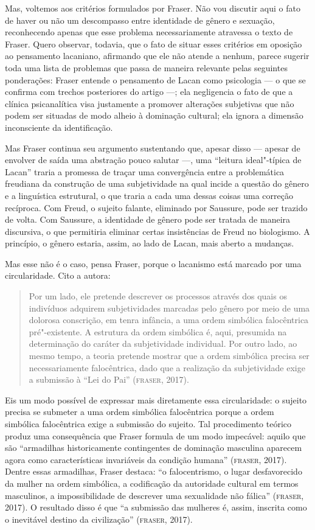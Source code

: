 Mas, voltemos aos critérios formulados por Fraser. Não vou discutir aqui
o fato de haver ou não um descompasso entre identidade de gênero e
sexuação, reconhecendo apenas que esse problema necessariamente
atravessa o texto de Fraser. Quero observar, todavia, que o fato de
situar esses critérios em oposição ao pensamento lacaniano, afirmando
que ele não atende a nenhum, parece sugerir toda uma lista de problemas
que passa de maneira relevante pelas seguintes ponderações: Fraser
entende o pensamento de Lacan como psicologia --- o que se confirma com
trechos posteriores do artigo ---; ela negligencia o fato de que a
clínica psicanalítica visa justamente a promover alterações subjetivas
que não podem ser situadas de modo alheio à dominação cultural; ela
ignora a dimensão inconsciente da identificação.

Mas Fraser continua seu argumento sustentando que, apesar disso ---
apesar de envolver de saída uma abstração pouco salutar ---, uma
``leitura ideal"-típica de Lacan'' traria a promessa de traçar uma
convergência entre a problemática freudiana da construção de uma
subjetividade na qual incide a questão do gênero e a linguística
estrutural, o que traria a cada uma dessas coisas uma correção
recíproca. Com Freud, o sujeito falante, eliminado por Saussure, pode
ser trazido de volta. Com Saussure, a identidade de gênero pode ser
tratada de maneira discursiva, o que permitiria eliminar certas
insistências de Freud no biologismo. A princípio, o gênero estaria,
assim, ao lado de Lacan, mais aberto a mudanças.

Mas esse não é o caso, pensa Fraser, porque o lacanismo está marcado por
uma circularidade. Cito a autora:

\begin{quote}
Por um lado, ele pretende descrever os processos através dos quais os
indivíduos adquirem subjetividades marcadas pelo gênero por meio de uma
dolorosa conscrição, em tenra infância, a uma ordem simbólica
falocêntrica pré"-existente. A estrutura da ordem simbólica é, aqui,
presumida na determinação do caráter da subjetividade individual. Por
outro lado, ao mesmo tempo, a teoria pretende mostrar que a ordem
simbólica precisa ser necessariamente falocêntrica, dado que a
realização da subjetividade exige a submissão à ``Lei do Pai''
(\textsc{fraser}, 2017).
\end{quote}

Eis um modo possível de expressar mais diretamente essa circularidade: o
sujeito precisa se submeter a uma ordem simbólica falocêntrica porque a
ordem simbólica falocêntrica exige a submissão do sujeito. Tal
procedimento teórico produz uma consequência que Fraser formula de um
modo impecável: aquilo que são ``armadilhas historicamente
contingentes de dominação masculina aparecem agora como características
invariáveis da condição humana'' (\textsc{fraser}, 2017). Dentre essas
armadilhas, Fraser destaca: ``o falocentrismo, o lugar
desfavorecido da mulher na ordem simbólica, a codificação da autoridade
cultural em termos masculinos, a impossibilidade de descrever uma
sexualidade não fálica'' (\textsc{fraser}, 2017). O resultado disso é que
``a submissão das mulheres é, assim, inscrita como o inevitável
destino da civilização'' (\textsc{fraser}, 2017).

